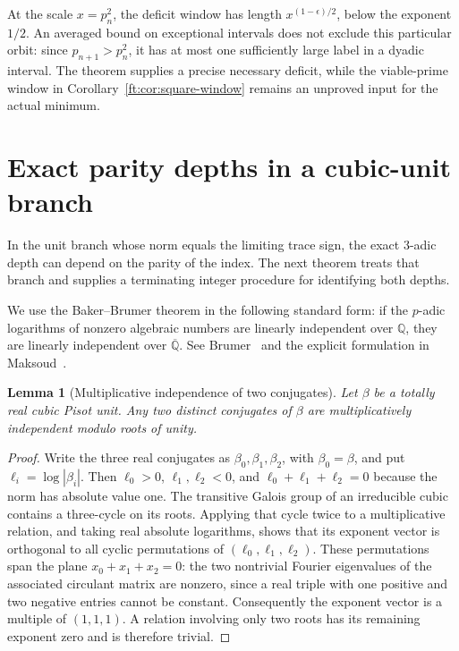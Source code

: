 \documentclass[11pt,a4paper]{article}
\newtheorem{lemma}[theorem]{Lemma}
\theoremstyle{definition}
\theoremstyle{remark}
\numberwithin{equation}{section}
\begin{document}
At the scale $x=p_n^2$, the deficit window has length
$x^{(1-\epsilon)/2}$, below the exponent $1/2$. An averaged bound on
exceptional intervals does not exclude this particular orbit: since
$p_{n+1}>p_n^2$, it has at most one sufficiently large label in a
dyadic interval. The theorem supplies a precise necessary deficit,
while the viable-prime window in Corollary~\ref{ft:cor:square-window}
remains an unproved input for the actual minimum.

\section{Exact parity depths in a cubic-unit branch}
\label{ft:sec:final-mills-parity}

In the unit branch whose norm equals the limiting trace sign,
the exact $3$-adic depth can depend on the parity of the index.
The next theorem treats that branch and supplies a terminating
integer procedure for identifying both depths.

We use the Baker--Brumer theorem in the following standard form:
if the $p$-adic logarithms of nonzero algebraic numbers are linearly
independent over $\mathbb Q$, they are linearly independent over
$\overline{\mathbb Q}$. See Brumer~\cite{Brumer1967} and the explicit formulation in
Maksoud~\cite[Theorem~2.1]{Maksoud2023}.

\begin{lemma}[Multiplicative independence of two conjugates]
\label{ft:lem:final-unit-independence}
Let $\beta$ be a totally real cubic Pisot unit. Any two distinct
conjugates of $\beta$ are multiplicatively independent modulo
roots of unity.
\end{lemma}
\begin{proof}
Write the three real conjugates as $\beta_0,\beta_1,\beta_2$,
with $\beta_0=\beta$, and put $\ell_i=\log|\beta_i|$.
Then $\ell_0>0$, $\ell_1,\ell_2<0$, and
$\ell_0+\ell_1+\ell_2=0$ because the norm has absolute value one.
The transitive Galois group of an irreducible cubic contains a
three-cycle on its roots. Applying that cycle twice to a
multiplicative relation, and taking real absolute logarithms,
shows that its exponent vector is orthogonal to all cyclic
permutations of $(\ell_0,\ell_1,\ell_2)$.
These permutations span the plane $x_0+x_1+x_2=0$: the two
nontrivial Fourier eigenvalues of the associated circulant matrix
are nonzero, since a real triple with one positive and two negative
entries cannot be constant. Consequently the exponent vector is a
multiple of $(1,1,1)$. A relation involving only two roots has its
remaining exponent zero and is therefore trivial.
\end{proof}
\end{document}
